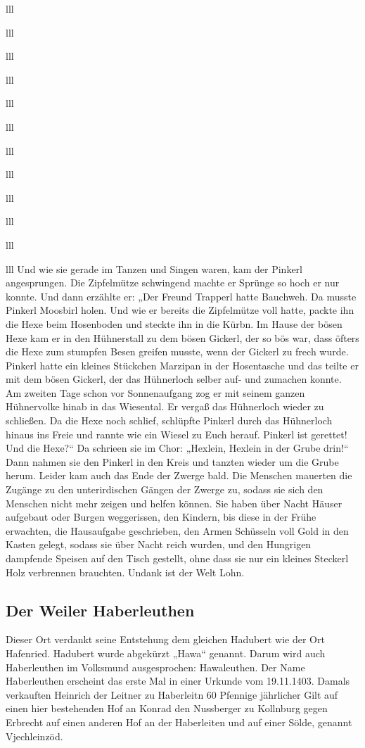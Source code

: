 \documentclass[12pt,a4pager]{book}
\begin{document}
\begin{tabuluar}{lll}
\begin{tabuluar}{lll}
\begin{tabuluar}{lll}
\begin{tabuluar}{lll}
\begin{tabuluar}{lll}
\begin{tabuluar}{lll}
\begin{tabuluar}{lll}
\begin{tabuluar}{lll}
\begin{tabuluar}{lll}
\begin{tabuluar}{lll}
\begin{tabuluar}{lll}
\begin{tabuluar}{lll}
Und wie sie gerade im Tanzen und Singen waren, kam der Pinkerl angesprungen. Die
Zipfelmütze schwingend machte er Sprünge so hoch er nur konnte. Und dann
erzählte er: „Der Freund Trapperl hatte Bauchweh. Da musste Pinkerl Moosbirl
holen. Und wie er bereits die Zipfelmütze voll hatte, packte ihn die Hexe beim
Hosenboden und steckte ihn in die Kürbn. Im Hause der bösen Hexe kam er in den
Hühnerstall zu dem bösen Gickerl, der so bös war, dass öfters die Hexe zum
stumpfen Besen greifen musste, wenn der Gickerl zu frech wurde. Pinkerl hatte
ein kleines Stückchen Marzipan in der Hosentasche und das teilte er mit dem
bösen Gickerl, der das Hühnerloch selber auf- und zumachen konnte. Am zweiten
Tage schon vor Sonnenaufgang zog er mit seinem ganzen Hühnervolke hinab in das
Wiesental. Er vergaß das Hühnerloch wieder zu schließen. Da die Hexe noch
schlief, schlüpfte Pinkerl durch das Hühnerloch hinaus ins Freie und rannte wie
ein Wiesel zu Euch herauf. Pinkerl ist gerettet! Und die Hexe?“ Da schrieen sie
im Chor: „Hexlein, Hexlein in der Grube drin!“ Dann nahmen sie den Pinkerl in
den Kreis und tanzten wieder um die Grube herum. Leider kam auch das Ende der
Zwerge bald. Die Menschen mauerten die Zugänge zu den unterirdischen Gängen der
Zwerge zu, sodass sie sich den Menschen nicht mehr zeigen und helfen können. Sie
haben über Nacht Häuser aufgebaut oder Burgen weggerissen, den Kindern, bis
diese in der Frühe erwachten, die Hausaufgabe geschrieben, den Armen Schüsseln
voll Gold in den Kasten gelegt, sodass sie über Nacht reich wurden, und den
Hungrigen dampfende Speisen auf den Tisch gestellt, ohne dass sie nur ein
kleines Steckerl Holz verbrennen brauchten. Undank ist der Welt Lohn.

\subsection{Der Weiler Haberleuthen}

Dieser Ort verdankt seine Entstehung dem gleichen Hadubert wie der Ort
Hafenried. Hadubert wurde abgekürzt „Hawa“ genannt. Darum wird auch Haberleuthen
im Volksmund ausgesprochen: Hawaleuthen. Der Name Haberleuthen erscheint das
erste Mal in einer Urkunde vom 19.11.1403. Damals verkauften Heinrich der
Leitner zu Haberleitn 60 Pfennige jährlicher Gilt auf einen hier bestehenden Hof
an Konrad den Nussberger zu Kollnburg gegen Erbrecht auf einen anderen Hof an
der Haberleiten und auf einer Sölde, genannt Vjechleinzöd.


\end{tabuluar}
\end{tabuluar}
\end{tabuluar}
\end{tabuluar}
\end{tabuluar}
\end{tabuluar}
\end{tabuluar}
\end{tabuluar}
\end{tabuluar}
\end{tabuluar}
\end{tabuluar}
\end{tabuluar}
\end{document}
